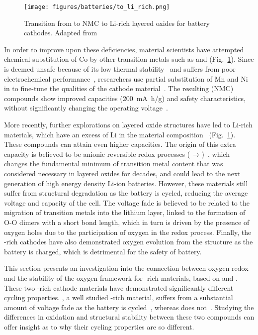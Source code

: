 \begin{refsection}
\begin{figure}[h] 
\centering 
\texttt{[image: figures/batteries/to\_li\_rich.png]} 
\caption{Transition from  to NMC to Li-rich layered oxides for 
battery cathodes. Adapted from~\cite{Rozier2015} } 
\label{batteries:fig-Lirich_transition} 
\end{figure} 
 
In order to improve upon these deficiencies, material scientists have 
attempted chemical substitution of Co by other transition metals such as 
 and  (Fig.~\ref{batteries:fig-Lirich_transition}). Since 
 is deemed unsafe because of its low thermal 
stability~\cite{Ohzuku1993} and  suffers from poor electrochemical 
performance~\cite{Vitins1997}, researchers use partial substitution of Mn and 
Ni in  to fine-tune the qualities of the cathode 
material~\cite{Koyama2003}. The resulting  (NMC) 
compounds show improved capacities (200~\si{\milli\ampere\hour/\gram}) and 
safety characteristics, without significantly changing the operating 
voltage~\cite{Zhou2011}.  
 
More recently, further explorations on layered oxide structures have led to 
Li-rich materials, which have an excess of Li in the material 
composition~\cite{Thackeray2007} (Fig.~\ref{batteries:fig-Lirich_transition}). 
These compounds can attain even higher capacities. The origin of this extra 
capacity is believed to be anionic reversible redox processes ( → 
)~\cite{Sathiya2013}, which changes the fundamental minimum of 
transition metal content that was considered necessary in layered oxides for 
decades, and could lead to the next generation of high energy density Li-ion 
batteries. However, these materials still suffer from structural degradation 
as the battery is cycled, reducing the average voltage and capacity of the 
cell. The voltage fade is believed to be related to the migration of 
transition metals into the lithium layer, linked to the formation of O-O 
dimers with a short bond length, which in turn is driven by the presence of 
oxygen holes due to the participation of oxygen in the redox process. Finally, 
the -rich cathodes have also demonstrated oxygen evolution from the 
structure as the battery is charged, which is detrimental for the safety of 
battery. 
 
This section presents an investigation into the connection between oxygen 
redox and the stability of the oxygen framework for -rich materials, 
based on  and . These two -rich cathode 
materials have demonstrated significantly different cycling properties. 
, a well studied -rich material, suffers from a substantial 
amount of voltage fade as the battery is cycled~\cite{Croy2014}, whereas 
 does not~\cite{McCalla2015}. Studying the differences in 
oxidation and structural stability between these two compounds can offer 
insight as to why their cycling properties are so different.  
 

\end{refsection}
